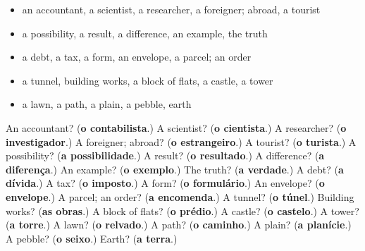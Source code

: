 \begin{itemize}
\raggedright
  \item an accountant, a scientist, a researcher, a foreigner; abroad, a tourist
  \item a possibility, a result, a difference, an example, the truth
  \item a debt, a tax, a form, an envelope, a parcel; an order
  \item a tunnel, building works, a block of flats, a castle, a tower
  \item a lawn, a path, a plain, a pebble, earth
\end{itemize}

\begin{tcolorbox}[breakable,colback=teal!4,colframe=teal!35!black,title={Before you move on}]
An accountant? (\textbf{o contabilista}.) A scientist? (\textbf{o cientista}.) A researcher? (\textbf{o investigador}.) A foreigner; abroad? (\textbf{o estrangeiro}.) A tourist? (\textbf{o turista}.) A possibility? (\textbf{a possibilidade}.) A result? (\textbf{o resultado}.) A difference? (\textbf{a diferença}.) An example? (\textbf{o exemplo}.) The truth? (\textbf{a verdade}.) A debt? (\textbf{a dívida}.) A tax? (\textbf{o imposto}.) A form? (\textbf{o formulário}.) An envelope? (\textbf{o envelope}.) A parcel; an order? (\textbf{a encomenda}.) A tunnel? (\textbf{o túnel}.) Building works? (\textbf{as obras}.) A block of flats? (\textbf{o prédio}.) A castle? (\textbf{o castelo}.) A tower? (\textbf{a torre}.) A lawn? (\textbf{o relvado}.) A path? (\textbf{o caminho}.) A plain? (\textbf{a planície}.) A pebble? (\textbf{o seixo}.) Earth? (\textbf{a terra}.)
\end{tcolorbox}
